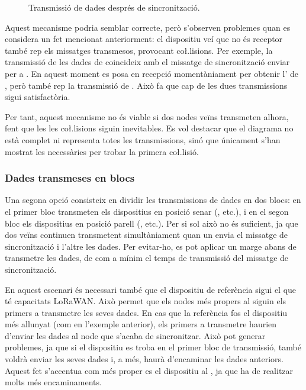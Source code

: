 \documentclass{tfgitic}[2024/07/01]
\begin{document}
{\begin{figure}
{\begin{tabular}
        \end{tabular}
    }
    \caption{Transmissió de dades després de sincronització.}
    \label{fig:app_opcioSyncExp1}
\end{figure}

Aquest mecanisme podria semblar correcte, però s'observen problemes quan es considera un fet mencionat anteriorment: el dispositiu veí que no és receptor també rep els missatges transmesos, provocant co\l.lisions. Per exemple, la transmissió de les dades de  coincideix amb el missatge de sincronització enviar per  a . En aquest moment  es posa en recepció momentàniament per obtenir l' de , però també rep la transmissió de . Això fa que cap de les dues transmissions sigui satisfactòria.

Per tant, aquest mecanisme no és viable si dos nodes veïns transmeten alhora, fent que les  les co\l.lisions siguin inevitables.
Es vol destacar que el diagrama no està complet ni representa totes les transmissions, sinó que únicament s'han mostrat les necessàries per trobar la primera co\l.lisió. 

\subsubsection{Dades transmeses en blocs}
Una segona opció consisteix en dividir les transmissions de dades en dos blocs: en el primer bloc transmeten els dispositius en posició senar (, etc.), i en el segon bloc els dispositius en posició parell (, etc.). Per si sol això no és suficient, ja que dos veïns continuen transmetent simultàniament quan un envia el missatge de sincronització i l'altre les dades. Per evitar-ho, es pot aplicar un marge abans de transmetre les dades, de com a mínim el temps de transmissió del missatge de sincronització. 

En aquest escenari és necessari també que el dispositiu de referència sigui el que té capacitats LoRaWAN. Això permet que els nodes més propers al  siguin els primers a transmetre les seves dades. En cas que la referència fos el dispositiu més allunyat (com en l'exemple anterior), els primers a transmetre haurien d'enviar les dades al node que s'acaba de sincronitzar. Això pot generar problemes, ja que si el dispositiu es troba en el primer bloc de transmissió, també voldrà enviar les seves dades i, a més, haurà d'encaminar les dades anteriors. Aquest fet s'accentua com més proper es el dispositiu al , ja que ha de realitzar molts més encaminaments.

}
\end{document}
